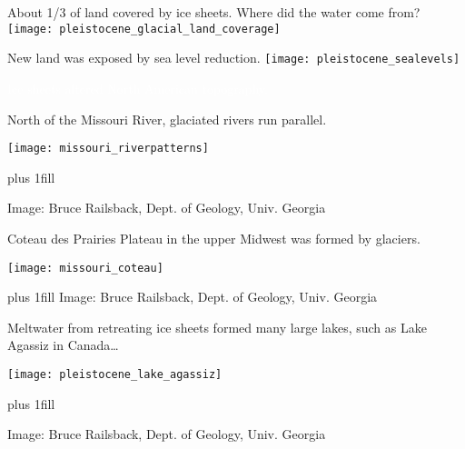\documentclass[t]{beamer}
\begin{document}
\begin{frame}{About 1/3 of land covered by ice sheets. Where did the water come from?}
	\texttt{[image: pleistocene\_glacial\_land\_coverage]}
\end{frame}

\begin{frame}{New land was exposed by sea level reduction.}
	\texttt{[image: pleistocene\_sealevels]}
\end{frame}


{
\begin{frame}[t]{\textcolor{white}{Ice sheets altered North American topography.}}
\end{frame}
}
\begin{frame}{North of the Missouri River, glaciated rivers run parallel.}
	\vspace{-1\baselineskip}
	\begin{center}
		\texttt{[image: missouri\_riverpatterns]}
	\end{center}

	\vskip0pt plus 1fill

	\hfill\tiny{Image: Bruce Railsback, Dept. of Geology, Univ. Georgia}
\end{frame}

\begin{frame}{Coteau des Prairies Plateau in the upper Midwest was formed by glaciers.}
		\vspace{-1\baselineskip}
		\begin{center}
			\texttt{[image: missouri\_coteau]}
		\end{center}
	\vskip0pt plus 1fill
	\hfill\tiny{Image: Bruce Railsback, Dept. of Geology, Univ. Georgia}
\end{frame}

\begin{frame}[t]{Meltwater from retreating ice sheets formed many large lakes, such as Lake Agassiz in Canada\dots}
		\vspace{-1\baselineskip}
		\begin{center}
			\texttt{[image: pleistocene\_lake\_agassiz]}
		\end{center}
	\vskip0pt plus 1fill
	
	\hfill\tiny{Image: Bruce Railsback, Dept. of Geology, Univ. Georgia}
\end{frame}
\end{document}
